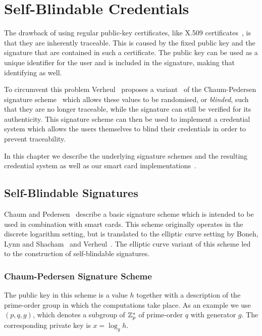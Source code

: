 \chapter{Self-Blindable Credentials\label{chp:self-blindable}}

The drawback of using regular public-key certificates, like X.509
certificates~\cite{ISO9594-8}, is that they are inherently traceable. This is
caused by the fixed public key and the signature that are contained in such a
certificate. The public key can be used as a unique identifier for the user and
is included in the signature, making that identifying as well.

To circumvent this problem Verheul~\cite{Verheul01} proposes a
variant~\cite{BonehLS01,BonehLS04} of the Chaum-Pedersen signature
scheme~\cite{ChaumPedersen93} which allows these values to be randomised, or
\emph{blinded}, such that they are no longer traceable, while the signature can
still be verified for its authenticity. This signature scheme can then be used
to implement a credential system which allows the users themselves to blind
their credentials in order to prevent traceability.

In this chapter we describe the underlying signature schemes and the resulting
credential system as well as our smart card
implementations~\cite{BatinaHJMV10,HoepmanJV10}.

\section{Self-Blindable Signatures}

Chaum and Pedersen~\cite{ChaumPedersen93} describe a basic signature scheme
which is intended to be used in combination with smart cards. This scheme
originally operates in the discrete logarithm setting, but is translated to the
elliptic curve setting by Boneh, Lynn and Shacham~\cite{BonehLS01,BonehLS04}
and Verheul~\cite{Verheul01}. The elliptic curve variant of this scheme led to
the construction of self-blindable signatures.

\subsection{Chaum-Pedersen Signature Scheme}

The public key in this scheme is a value $h$ together with a description of the
prime-order group in which the computations take place. As an example we use
$(p, q, g)$, which denotes a subgroup of $\mathbb{Z}^*_p$ of prime-order $q$ with
generator $g$. The corresponding private key is $x = \log_g h$.

